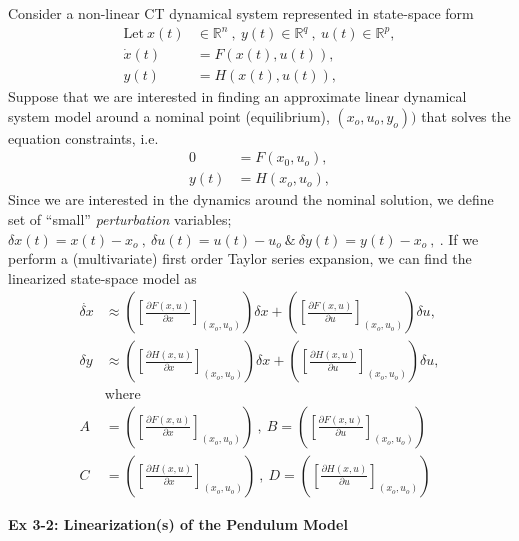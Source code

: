 \documentclass[twoside]{article}
\begin{document}
Consider a non-linear CT dynamical system represented in state-space form
%
\begin{align*}
  \mathrm{Let} \ x(t) &\in \mathbb{R}^n \ , \ y(t) \in \mathbb{R}^q \ ,\  u(t) \in
  \mathbb{R}^p , \\
  \dot{x}(t) &= F(x(t),u(t)) , \\
  y(t) &= H(x(t),u(t)) , 
\end{align*}
%
Suppose that we are interested in finding an approximate linear
dynamical system model around a nominal point (equilibrium),
$(x_o,u_o,y_o))$ that solves the equation constraints, i.e.
%
\begin{align*}
  0 &= F(x_0,u_o) , \\
  y(t) &= H(x_o,u_o) , 
\end{align*}
%
Since we are interested in the dynamics around the nominal solution, we
define set of ``small'' \textit{perturbation} variables; $\delta x(t)
= x(t) - x_o \ , \ \delta u(t) = u(t) - u_o \ \& \ \delta y(t) = y(t)
- x_o \ , \ $. If we perform a (multivariate) first order Taylor
series expansion, we can find the linearized state-space model as
%
\begin{align*}
  \dot{\delta x} &\approx \left( \left[ \frac{\partial F(x,u)}{\partial x}
                      \right]_{(x_o,u_o)} \right) \delta x + \left( \left[ \frac{\partial F(x,u)}{\partial u}
                      \right]_{(x_o,u_o)} \right) \delta u  , \\
  \delta y  &\approx \left( \left[ \frac{\partial H(x,u)}{\partial x}
                      \right]_{(x_o,u_o)} \right) \delta x + \left( \left[ \frac{\partial H(x,u)}{\partial u}
                      \right]_{(x_o,u_o)} \right) \delta u , 
\\ 
&\mathrm{where}
\\
A &= \left( \left[ \frac{\partial F(x,u)}{\partial x}
                      \right]_{(x_o,u_o)} \right) \ , \ B = \left( \left[ \frac{\partial F(x,u)}{\partial u}
                      \right]_{(x_o,u_o)} \right)
\\
C &= \left( \left[ \frac{\partial H(x,u)}{\partial x}
                      \right]_{(x_o,u_o)} \right) \ , \ D = \left( \left[ \frac{\partial H(x,u)}{\partial u}
                      \right]_{(x_o,u_o)} \right)
\end{align*}
%

\textbf{Ex 3-2: Linearization(s) of the Pendulum Model}
\end{document}
